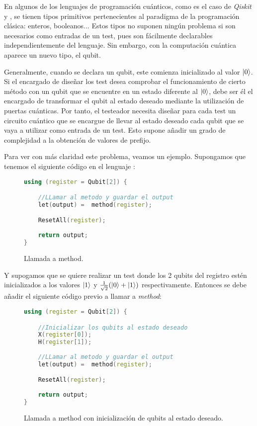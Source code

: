En algunos de los lenguajes de programación cuánticos, como es el caso de \textit{Qiskit} y \qsh, se tienen tipos primitivos pertenecientes al paradigma de la programación clásica: enteros, booleanos... Estos tipos no suponen ningún problema si son necesarios como entradas de un test, pues son fácilmente declarables independientemente del lenguaje. Sin embargo, con la computación cuántica aparece un nuevo tipo, el qubit. 

Generalmente, cuando se declara un qubit, este comienza inicializado al valor $\left|0\right\rangle$. Si el encargado de diseñar los test desea comprobar el funcionamiento de cierto método con un qubit que se encuentre en un estado diferente al $\left|0\right\rangle$, debe ser él el encargado de transformar el qubit al estado deseado mediante la utilización de puertas cuánticas. Por tanto, el testeador necesita diseñar para cada test un circuito cuántico que se encargue de llevar al estado deseado cada qubit que se vaya a utilizar como entrada de un test. Esto supone añadir un grado de complejidad a la obtención de valores de prefijo.

Para ver con más claridad este problema, veamos un ejemplo. Supongamos que tenemos el siguiente código en el lenguaje \qsh:

\begin{figure}[htb]
\begin{lstlisting}[language=c++]
using (register = Qubit[2]) {

	//LLamar al metodo y guardar el output
	let(output) =  method(register);

	ResetAll(register);
	
	return output;
}
\end{lstlisting}
\caption{Llamada a method.}
\label{fig:code41}
\end{figure}

Y supogamos que se quiere realizar un test donde los 2 qubits del registro estén inicializados a los valores $\left|1\right\rangle$ y $\tfrac{1}{\sqrt{2}}(\left|0\right\rangle+\left|1\right\rangle)$ respectivamente. Entonces se 
debe añadir el siguiente código previo a llamar a \textit{method}:\clearpage

\begin{figure}[htb]
\begin{lstlisting}[language=c++]
using (register = Qubit[2]) {

	//Inicializar los qubits al estado deseado
	X(register[0]);
	H(register[1]);
	
	//LLamar al metodo y guardar el output
	let(output) =  method(register);

	ResetAll(register);
	
	return output;
}
\end{lstlisting}
\caption{Llamada a method con inicialización de qubits al estado deseado.}
\label{fig:code42}
\end{figure}


